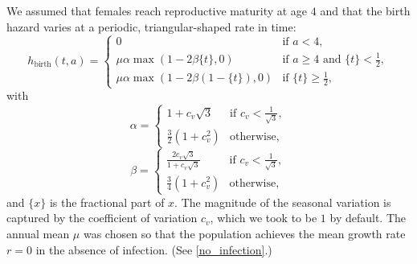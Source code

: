 \documentclass{jpmarticle}
\begin{document}
We assumed that females reach reproductive maturity at age $4$ and
that the birth hazard varies at a periodic, triangular-shaped rate in
time:
\begin{equation}
  h_{\text{birth}}(t, a) =
  \begin{cases}
    0 & \text{if $a < 4$},
    \\
    \mu \alpha \max\left(1 - 2 \beta \{t\}, 0\right)
    & \text{if $a \geq 4$ and $\{t\} < \frac{1}{2}$},
    \\
    \mu \alpha \max\left(1 - 2 \beta (1 - \{t\}), 0\right)
    & \text{if $\{t\} \geq \frac{1}{2}$},
  \end{cases}
\end{equation}
with
\begin{equation}
  \alpha =
  \begin{cases}
    1 + c_v \sqrt{3}
    & \text{if $c_v < \frac{1}{\sqrt{3}}$},
    \\
    \frac{3}{2} \left(1 + c_v^2\right)
    & \text{otherwise},
  \end{cases}
\end{equation}
\begin{equation}
  \beta =
  \begin{cases}
    \frac{2 c_v \sqrt{3}}{1 + c_v \sqrt{3}}
    & \text{if $c_v < \frac{1}{\sqrt{3}}$},
    \\
    \frac{3}{4} \left(1 + c_v^2\right)
    & \text{otherwise},
  \end{cases}
\end{equation}
and $\{x\}$ is the fractional part of $x$.  The magnitude of the
seasonal variation is captured by the coefficient of variation $c_v$,
which we took to be $1$ by default.  The annual mean $\mu$ was chosen
so that the population achieves the mean growth rate $r = 0$ in the
absence of infection.  (See \autoref{no_infection}.)
\end{document}
